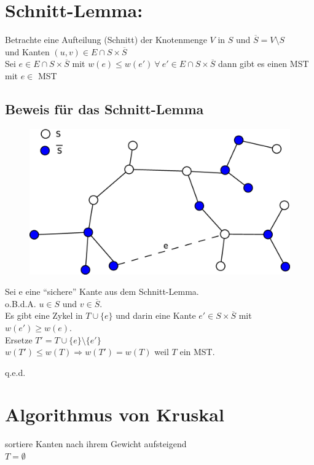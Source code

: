 \section{Schnitt-Lemma:}
Betrachte eine Aufteilung (Schnitt) der Knotenmenge $V$ in $S$ und $\overline{S} = V\setminus S$ \\und Kanten $(u,v) \in E \cap S\times \overline{S}$\\
Sei $e \in E \cap S \times \overline{S}$ mit $w(e) \leq w(e') ~\forall ~e' \in E \cap S\times \overline{S}$ dann gibt es einen MST mit $e \in$ MST
\subsection{Beweis für das Schnitt-Lemma}
\begin{figure}[h]
\centering
\includegraphics[width=0.5\linewidth]{19/Grafik/SpannbaumBeweis}
\caption{}
\label{fig:SpannbaumBeweis}
\end{figure}

Sei e eine "`sichere"' Kante aus dem Schnitt-Lemma.\\
o.B.d.A. $u\in S$ und $v \in \overline{S}$.\\
Es gibt eine Zykel in $T\cup \{e\}$ und darin eine Kante $e'\in S\times \overline{S}$ mit $w(e') \geq w(e)$.\\
Ersetze $T'=T\cup\{e\}\setminus\{ e' \}$\\
$w(T') \leq w(T) \Rightarrow w(T') = w(T)$ weil $T$ ein MST.
\begin{flushright}
	q.e.d.
\end{flushright}
\section{Algorithmus von Kruskal}
sortiere Kanten nach ihrem Gewicht aufsteigend\\
$T=\emptyset$\\

